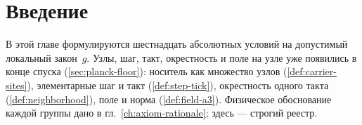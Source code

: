 \section{Введение}

В этой главе формулируются шестнадцать абсолютных условий на допустимый локальный закон~$g$.
Узлы, шаг, такт, окрестность и поле на узле уже появились в конце спуска
(\cref{sec:planck-floor}):
носитель как множество узлов (\cref{def:carrier-sites}),
элементарные шаг и такт (\cref{def:step-tick}),
окрестность одного такта (\cref{def:neighborhood}),
поле и норма (\cref{def:field-a3}).
Физическое обоснование каждой группы дано в гл.~\ref{ch:axiom-rationale};
здесь --- строгий реестр.

